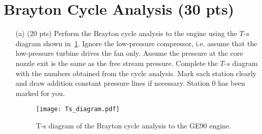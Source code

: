 \documentclass[11pt]{article}
\begin{document}
\section{Brayton Cycle Analysis (30 pts)}
\begin{itemize}
	\item[(a)] (20 pts) Perform the Brayton cycle analysis to the engine using the $T$-$s$ diagram shown in~\cref{fig:Ts}. Ignore the low-pressure compressor, i.e. assume that the low-pressure turbine drives the fan only. Assume the pressure at the core nozzle exit is the same as the free stream pressure. Complete the $T$-$s$ diagram with the numbers obtained from the cycle analysis. Mark each station clearly and draw addition constant pressure lines if necessary. Station 0 has been marked for you. 
	
	\begin{figure}[ht]
		\centering
		\texttt{[image: Ts\_diagram.pdf]}
	    \caption{T-s diagram of the Brayton cycle analysis to the GE90 engine.}
		\label{fig:Ts}
	\end{figure}
	

\end{itemize}
\end{document}
